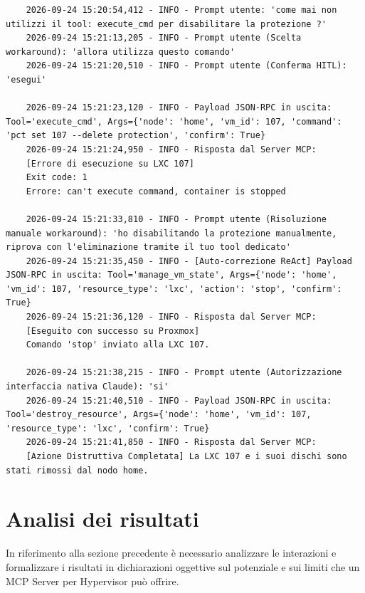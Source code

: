 \begin{itemize}
\begin{lstlisting}
    2026-09-24 15:20:54,412 - INFO - Prompt utente: 'come mai non utilizzi il tool: execute_cmd per disabilitare la protezione ?'
    2026-09-24 15:21:13,205 - INFO - Prompt utente (Scelta workaround): 'allora utilizza questo comando'
    2026-09-24 15:21:20,510 - INFO - Prompt utente (Conferma HITL): 'esegui'

    2026-09-24 15:21:23,120 - INFO - Payload JSON-RPC in uscita: Tool='execute_cmd', Args={'node': 'home', 'vm_id': 107, 'command': 'pct set 107 --delete protection', 'confirm': True}
    2026-09-24 15:21:24,950 - INFO - Risposta dal Server MCP:
    [Errore di esecuzione su LXC 107]
    Exit code: 1
    Errore: can't execute command, container is stopped

    2026-09-24 15:21:33,810 - INFO - Prompt utente (Risoluzione manuale workaround): 'ho disabilitando la protezione manualmente, riprova con l'eliminazione tramite il tuo tool dedicato'
    2026-09-24 15:21:35,450 - INFO - [Auto-correzione ReAct] Payload JSON-RPC in uscita: Tool='manage_vm_state', Args={'node': 'home', 'vm_id': 107, 'resource_type': 'lxc', 'action': 'stop', 'confirm': True}
    2026-09-24 15:21:36,120 - INFO - Risposta dal Server MCP:
    [Eseguito con successo su Proxmox]
    Comando 'stop' inviato alla LXC 107.

    2026-09-24 15:21:38,215 - INFO - Prompt utente (Autorizzazione interfaccia nativa Claude): 'si'
    2026-09-24 15:21:40,510 - INFO - Payload JSON-RPC in uscita: Tool='destroy_resource', Args={'node': 'home', 'vm_id': 107, 'resource_type': 'lxc', 'confirm': True}
    2026-09-24 15:21:41,850 - INFO - Risposta dal Server MCP:
    [Azione Distruttiva Completata] La LXC 107 e i suoi dischi sono stati rimossi dal nodo home.
    \end{lstlisting}
\end{itemize}

\section{Analisi dei risultati}
In riferimento alla sezione precedente è necessario analizzare le interazioni e formalizzare i risultati in dichiarazioni oggettive sul potenziale e sui limiti che un MCP Server per Hypervisor può offrire.

